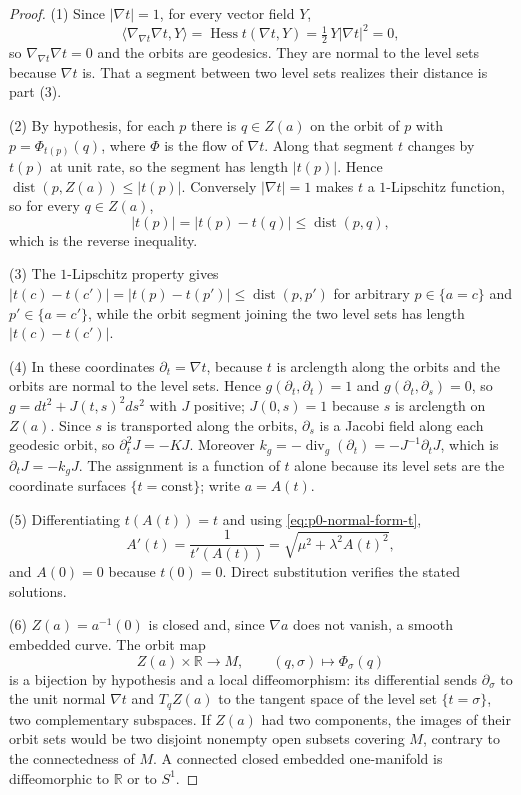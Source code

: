 \begin{proof}
(1) Since $|\nabla t|=1$, for every vector field $Y$,
\[
 \langle\nabla_{\nabla t}\nabla t,Y\rangle
 =\operatorname{Hess}t(\nabla t,Y)
 =\tfrac12\,Y|\nabla t|^2=0,
\]
so $\nabla_{\nabla t}\nabla t=0$ and the orbits are geodesics.  They are normal
to the level sets because $\nabla t$ is.  That a segment between two level sets
realizes their distance is part (3).

(2) By hypothesis, for each $p$ there is $q\in Z(a)$ on the orbit of $p$ with
$p=\Phi_{t(p)}(q)$, where $\Phi$ is the flow of $\nabla t$.  Along that segment
$t$ changes by $t(p)$ at unit rate, so the segment has length $|t(p)|$.  Hence
$\operatorname{dist}(p,Z(a))\le|t(p)|$.  Conversely $|\nabla t|=1$ makes $t$ a
$1$-Lipschitz function, so for every $q\in Z(a)$,
\[
 |t(p)|=|t(p)-t(q)|\le\operatorname{dist}(p,q),
\]
which is the reverse inequality.

(3) The $1$-Lipschitz property gives
$|t(c)-t(c')|=|t(p)-t(p')|\le\operatorname{dist}(p,p')$ for arbitrary
$p\in\{a=c\}$ and $p'\in\{a=c'\}$, while the orbit segment joining the two level
sets has length $|t(c)-t(c')|$.

(4) In these coordinates $\partial_t=\nabla t$, because $t$ is arclength along
the orbits and the orbits are normal to the level sets.  Hence
$g(\partial_t,\partial_t)=1$ and $g(\partial_t,\partial_s)=0$, so
$g=dt^2+J(t,s)^2ds^2$ with $J$ positive; $J(0,s)=1$ because $s$ is arclength on
$Z(a)$.  Since $s$ is transported along the orbits, $\partial_s$ is a Jacobi
field along each geodesic orbit, so $\partial_t^2J=-KJ$.  Moreover
$k_g=-\operatorname{div}_g(\partial_t)=-J^{-1}\partial_tJ$, which is
$\partial_tJ=-k_gJ$.  The assignment is a function of $t$ alone because its level
sets are the coordinate surfaces $\{t=\text{const}\}$; write $a=A(t)$.

(5) Differentiating $t(A(t))=t$ and using \eqref{eq:p0-normal-form-t},
\[
 A'(t)=\frac1{t'(A(t))}=\sqrt{\mu^2+\lambda^2A(t)^2},
\]
and $A(0)=0$ because $t(0)=0$.  Direct substitution verifies the stated
solutions.

(6) $Z(a)=a^{-1}(0)$ is closed and, since $\nabla a$ does not vanish, a smooth
embedded curve.  The orbit map
\[
 Z(a)\times\mathbb R\longrightarrow M,
 \qquad (q,\sigma)\longmapsto\Phi_\sigma(q)
\]
is a bijection by hypothesis and a local diffeomorphism: its differential sends
$\partial_\sigma$ to the unit normal $\nabla t$ and $T_qZ(a)$ to the tangent
space of the level set $\{t=\sigma\}$, two complementary subspaces.  If $Z(a)$
had two components, the images of their orbit sets would be two disjoint
nonempty open subsets covering $M$, contrary to the connectedness of $M$.  A
connected closed embedded one-manifold is diffeomorphic to $\mathbb R$ or to
$S^1$.
\end{proof}

